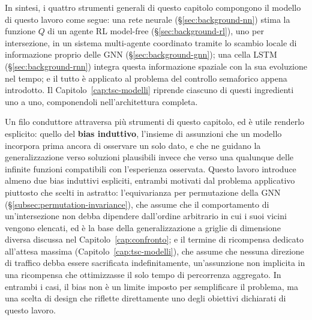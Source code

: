 \bigskip
\noindent In sintesi, i quattro strumenti generali di questo capitolo
compongono il modello di questo lavoro come segue: una rete neurale
(§\ref{sec:background-nn}) stima la funzione $Q$ di un agente RL
model-free (§\ref{sec:background-rl}), uno per intersezione, in un
sistema multi-agente coordinato tramite lo scambio locale di informazione
proprio delle GNN (§\ref{sec:background-gnn}); una cella LSTM
(§\ref{sec:background-rnn}) integra questa informazione spaziale con la
sua evoluzione nel tempo; e il tutto è applicato al problema del
controllo semaforico appena introdotto. Il
Capitolo~\ref{cap:tsc-modelli} riprende ciascuno di questi ingredienti
uno a uno, componendoli nell'architettura completa.

Un filo conduttore attraversa più strumenti di questo capitolo, ed è utile
renderlo esplicito: quello del \textbf{bias induttivo}, l'insieme di
assunzioni che un modello incorpora prima ancora di osservare un solo
dato, e che ne guidano la generalizzazione verso soluzioni plausibili
invece che verso una qualunque delle infinite funzioni compatibili con
l'esperienza osservata. Questo lavoro introduce almeno due bias induttivi
espliciti, entrambi motivati dal problema applicativo piuttosto che
scelti in astratto: l'equivarianza per permutazione della GNN
(§\ref{subsec:permutation-invariance}), che assume che il comportamento
di un'intersezione non debba dipendere dall'ordine arbitrario in cui i
suoi vicini vengono elencati, ed è la base della generalizzazione a
griglie di dimensione diversa discussa nel Capitolo~\ref{cap:confronto};
e il termine di ricompensa dedicato all'attesa massima
(Capitolo~\ref{cap:tsc-modelli}), che assume che nessuna direzione di
traffico debba essere sacrificata indefinitamente, un'assunzione non
implicita in una ricompensa che ottimizzasse il solo tempo di percorrenza
aggregato. In entrambi i casi, il bias non è un limite imposto per
semplificare il problema, ma una scelta di design che riflette
direttamente uno degli obiettivi dichiarati di questo lavoro.
